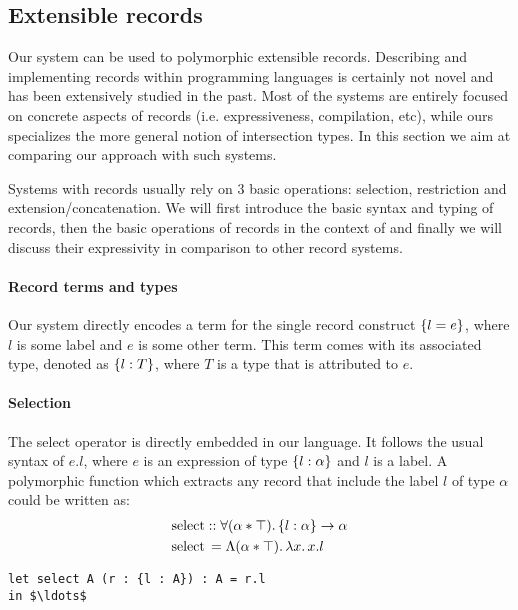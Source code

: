 \subsection{Extensible records}
Our system can be used to polymorphic extensible records. Describing and
implementing records within programming languages is certainly not
novel and has been extensively studied in the past. Most of the
systems are entirely focused on concrete aspects of records
(i.e. expressiveness, compilation, etc), while ours specializes
the more general notion of intersection types.  In this section we aim
at comparing our approach with such systems.

Systems with records usually rely on 3 basic operations: selection,
restriction and extension/concatenation.  We will first introduce the
basic syntax and typing of records, then the basic operations of
records in the context of \name and finally we will discuss their
expressivity in comparison to other record systems.

\paragraph{Record terms and types}
Our system directly encodes a term for the single record construct $\{ l = e \}$, where $l$ is some
label and $e$ is some other term.
This term comes with its associated type, denoted as $\{ l : T \}$, where $T$ is a type that is attributed 
to $e$. 

\paragraph{Selection}
The select operator is directly embedded in our language. 
It follows the usual syntax of $e.l$, where $e$ is an expression of type $\{ l : \alpha \}$ and 
$l$ is a label.
A polymorphic function which extracts any record that include the label $l$ of type
$\alpha$ could be written as:
\begin{align*}
&\text{select} :: \forall (\alpha * \top).\, \{ l : \alpha \} \rightarrow \alpha \\
&\text{select} \, = \Lambda (\alpha * \top).\, \lambda x.\, x.l
\end{align*}

\begin{lstlisting}[mathescape=true]
let select A (r : {l : A}) : A = r.l
in $\ldots$ 
\end{lstlisting}


